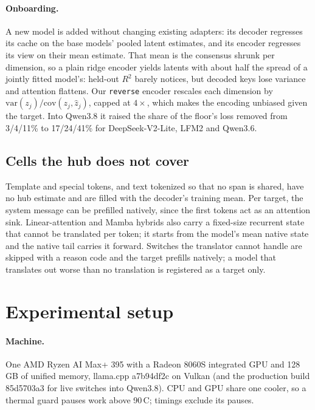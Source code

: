 \documentclass[11pt]{article}
\begin{document}
\paragraph{Onboarding.} A new model is added without changing existing adapters: its decoder regresses its
cache on the base models' pooled latent estimates, and its encoder regresses its view on their mean
estimate. That mean is the consensus shrunk per dimension, so a plain ridge encoder yields latents with about
half the spread of a jointly fitted model's: held-out $R^2$ barely notices, but decoded keys lose variance and
attention flattens. Our \texttt{reverse} encoder rescales each dimension by
$\mathrm{var}(z_j)/\mathrm{cov}(z_j,\hat z_j)$, capped at $4\times$, which makes the encoding unbiased given
the target. Into Qwen3.8 it raised the share of the floor's loss removed from 3/4/11\% to 17/24/41\% for
DeepSeek-V2-Lite, LFM2 and Qwen3.6.

\subsection{Cells the hub does not cover}\label{sec:switch}
Template and special tokens, and text tokenized so that no span is shared, have no hub estimate and are
filled with the decoder's training mean. Per target, the system message can be prefilled natively, since
the first tokens act as an attention sink. Linear-attention and Mamba hybrids also carry a fixed-size
recurrent state that cannot be translated per token; it starts from the model's mean native state and the
native tail carries it forward. Switches the translator cannot handle are skipped with a reason code and the
target prefills natively; a model that translates out worse than no translation is registered as a target
only.

\section{Experimental setup}\label{sec:setup}

\paragraph{Machine.} One AMD Ryzen AI Max+ 395 with a Radeon 8060S integrated GPU and 128\,GB of
unified memory, llama.cpp a7b94df2c on Vulkan (and the production build 85d5703a3 for live
switches into Qwen3.8). CPU and GPU share one cooler, so a
thermal guard pauses work above 90\,\textdegree C; timings exclude its pauses.
\end{document}
